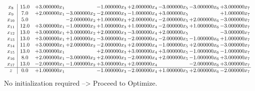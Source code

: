\documentclass[10pt]{article}
\begin{document}
\[\begin{array}{c| c c@{\hskip 2pt} c@{\hskip 2pt} c@{\hskip 2pt} c@{\hskip 2pt} c@{\hskip 2pt} c@{\hskip 2pt} c@{\hskip 2pt} }
 x_{8}   &  15.0 & + 3.000000 x_{1} &   & -1.000000 x_{3} & + 2.000000 x_{4} & -3.000000 x_{5} & -3.000000 x_{6} & + 3.000000 x_{7}\\
 x_{9}   &  7.0 & + 2.000000 x_{1} & -3.000000 x_{2} & -2.000000 x_{3} & -1.000000 x_{4} & + 3.000000 x_{5} &   & + 1.000000 x_{7}\\
 x_{10}   &  5.0  &   & -2.000000 x_{2} & + 1.000000 x_{3} & + 2.000000 x_{4} & -2.000000 x_{5} & + 2.000000 x_{6} & -3.000000 x_{7}\\
 x_{11}   &  12.0 & + 3.000000 x_{1} & -1.000000 x_{2} & + 1.000000 x_{3} & + 1.000000 x_{4} & -2.000000 x_{5} & + 1.000000 x_{6} & -3.000000 x_{7}\\
 x_{12}   &  13.0 & + 3.000000 x_{1} & + 3.000000 x_{2} & + 2.000000 x_{3} & -3.000000 x_{4} & + 2.000000 x_{5} &   & -3.000000 x_{7}\\
 x_{13}   &  13.0 & + 3.000000 x_{1} & + 1.000000 x_{2} & -3.000000 x_{3} & -2.000000 x_{4} & -2.000000 x_{5} & -1.000000 x_{6} & + 1.000000 x_{7}\\
 x_{14}   &  11.0 & + 3.000000 x_{1} & + 2.000000 x_{2} & -2.000000 x_{3} & + 2.000000 x_{4} & -1.000000 x_{5} & + 2.000000 x_{6} & -3.000000 x_{7}\\
 x_{15}   &  13.0 & + 3.000000 x_{1} &   & + 2.000000 x_{3} & + 3.000000 x_{4} & + 3.000000 x_{5} & -1.000000 x_{6} & -1.000000 x_{7}\\
 x_{16}   &  8.0 & + 2.000000 x_{1} & -3.000000 x_{2} & + 2.000000 x_{3} & -2.000000 x_{4} & + 2.000000 x_{5} & -1.000000 x_{6} & + 3.000000 x_{7}\\
 x_{17}   &  13.0 & -2.000000 x_{1} & -1.000000 x_{2} & + 3.000000 x_{3} & + 2.000000 x_{4} &   & -2.000000 x_{6} & + 3.000000 x_{7}\\
\hline
z    &  0.0 & + 1.000000 x_{1} &   & -1.000000 x_{3} & -2.000000 x_{4} & + 1.000000 x_{5} & + 2.000000 x_{6} & -2.000000 x_{7}\\
\end{array}\]
No initialization required --> Proceed to Optimize. 
\end{document}
